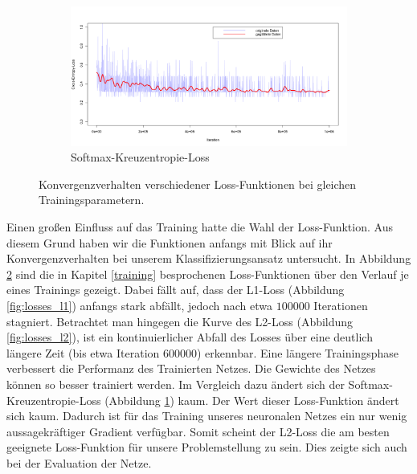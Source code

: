 \begin{figure}[htb!]
\begin{subfigure}[t]{0.49\textwidth}
	\end{subfigure}
	\hfill
	\begin{subfigure}[t]{0.49\textwidth}
		\includegraphics[width=\textwidth]{pics/losses/ce_loss.png}
		\caption{Softmax-Kreuzentropie-Loss}
		\label{fig:losses_ce}
	\end{subfigure}		
	\caption{Konvergenzverhalten verschiedener Loss-Funktionen bei gleichen Trainingsparametern.}
	\label{fig:losses}			
\end{figure}

Einen großen Einfluss auf das Training hatte die Wahl der Loss-Funktion. Aus diesem Grund haben wir die Funktionen anfangs mit Blick auf ihr Konvergenzverhalten bei unserem Klassifizierungsansatz untersucht. In Abbildung \ref{fig:losses} sind die in Kapitel \ref{training} besprochenen Loss-Funktionen über den Verlauf je eines Trainings gezeigt. Dabei fällt auf, dass der L1-Loss (Abbildung \ref{fig:losses_l1}) anfangs stark abfällt, jedoch nach etwa $100000$ Iterationen stagniert. Betrachtet man hingegen die Kurve des L2-Loss (Abbildung \ref{fig:losses_l2}), ist ein kontinuierlicher Abfall des Losses über eine deutlich längere Zeit (bis etwa Iteration $600000$) erkennbar. Eine längere Trainingsphase verbessert die Performanz des Trainierten Netzes. Die Gewichte des Netzes können so besser trainiert werden. Im Vergleich dazu ändert sich der Softmax-Kreuzentropie-Loss (Abbildung \ref{fig:losses_ce}) kaum. Der Wert dieser Loss-Funktion ändert sich kaum. Dadurch ist für das Training unseres neuronalen Netzes ein nur wenig aussagekräftiger Gradient verfügbar. Somit scheint der L2-Loss die am besten geeignete Loss-Funktion für unsere Problemstellung zu sein. Dies zeigte sich auch bei der Evaluation der Netze.\\

